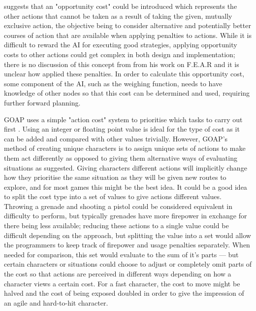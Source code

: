 \documentclass[11pt, a4paper]{report}
\begin{document}
\citeauthor{harmon2002economic} \parencite*[405]{harmon2002economic} suggests that an "opportunity cost" could be introduced which represents the other actions that cannot be taken as a result of taking the given, mutually exclusive action, the objective being to consider alternative and potentially better courses of action that are available when applying penalties to actions. While it is difficult to reward the AI for executing good strategies, applying opportunity costs to other actions could get complex in both design and implementation; there is no discussion of this concept from \citeauthor{orkin2006three} \parencite*{orkin2006three} from his work on F.E.A.R and it is unclear how \citeauthor{harmon2002economic} applied these penalties. In order to calculate this opportunity cost, some component of the AI, such as the weighing function, needs to have knowledge of other nodes so that this cost can be determined and used, requiring further forward planning.

GOAP uses a simple "action cost" system to prioritise which tasks to carry out first \parencite[11]{orkin2006three}. Using an integer or floating point value is ideal for the type of cost as it can be added and compared with other values trivially. However, GOAP's method of creating unique characters is to assign unique sets of actions to make them act differently \parencite[8]{orkin2006three} as opposed to giving them alternative ways of evaluating situations as \citeauthor{millington2019ai} \parencite*{millington2019ai} suggested. Giving characters different actions will implicitly change how they prioritise the same situation as they will be given new routes to explore, and for most games this might be the best idea. It could be a good idea to split the cost type into a set of values to give actions different values. Throwing a grenade and shooting a pistol could be considered equivalent in difficulty to perform, but typically grenades have more firepower in exchange for there being less available; reducing these actions to a single value could be difficult depending on the approach, but splitting the value into a set would allow the programmers to keep track of firepower and usage penalties separately. When needed for comparison, this set would evaluate to the sum of it's parts --- but certain characters or situations could choose to adjust or completely omit parts of the cost so that actions are perceived in different ways depending on how a character views a certain cost. For a fast character, the cost to move might be halved and the cost of being exposed doubled in order to give the impression of an agile and hard-to-hit character.
\end{document}
